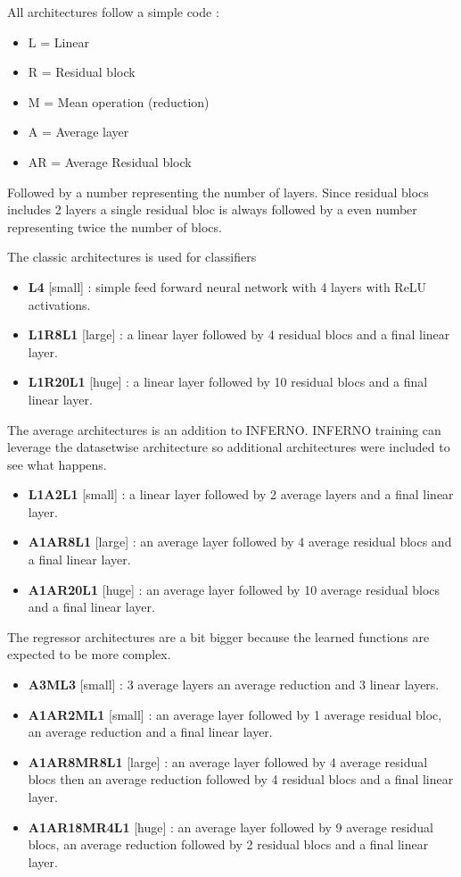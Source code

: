 All architectures follow a simple code :
\begin{itemize}
	\item L = Linear
	\item R = Residual block
	\item M = Mean operation (reduction)
	\item A = Average layer
	\item AR = Average Residual block
\end{itemize}
Followed by a number representing the number of layers.
Since residual blocs includes 2 layers a single residual bloc is always followed by a even number representing twice the number of blocs.

The classic architectures is used for classifiers
\begin{itemize}
	\item \textbf{L4} [small] : simple feed forward neural network with 4 layers with ReLU activations.
	\item \textbf{L1R8L1} [large] : a linear layer followed by 4 residual blocs and a final linear layer.
	\item \textbf{L1R20L1} [huge] : a linear layer followed by 10 residual blocs and a final linear layer.
\end{itemize}

The average architectures is an addition to INFERNO.
INFERNO training can leverage the datasetwise architecture so additional architectures were included to see what happens.
\begin{itemize}
	\item \textbf{L1A2L1} [small] : a linear layer followed by 2 average layers and a final linear layer.
	\item \textbf{A1AR8L1} [large] : an average layer followed by 4 average residual blocs and a final linear layer.
	\item \textbf{A1AR20L1} [huge] : an average layer followed by 10 average residual blocs and a final linear layer.
\end{itemize}

The regressor architectures are a bit bigger because the learned functions are expected to be more complex.
\begin{itemize}
	\item \textbf{A3ML3} [small] : 3 average layers an average reduction and 3 linear layers.
	\item \textbf{A1AR2ML1} [small] : an average layer followed by 1 average residual bloc, an average reduction and a final linear layer.
	\item \textbf{A1AR8MR8L1} [large] : an average layer followed by 4 average residual blocs then an average reduction followed by 4 residual blocs and a final linear layer.
	\item \textbf{A1AR18MR4L1} [huge] : an average layer followed by 9 average residual blocs, an average reduction followed by 2 residual blocs and a final linear layer.
\end{itemize}


